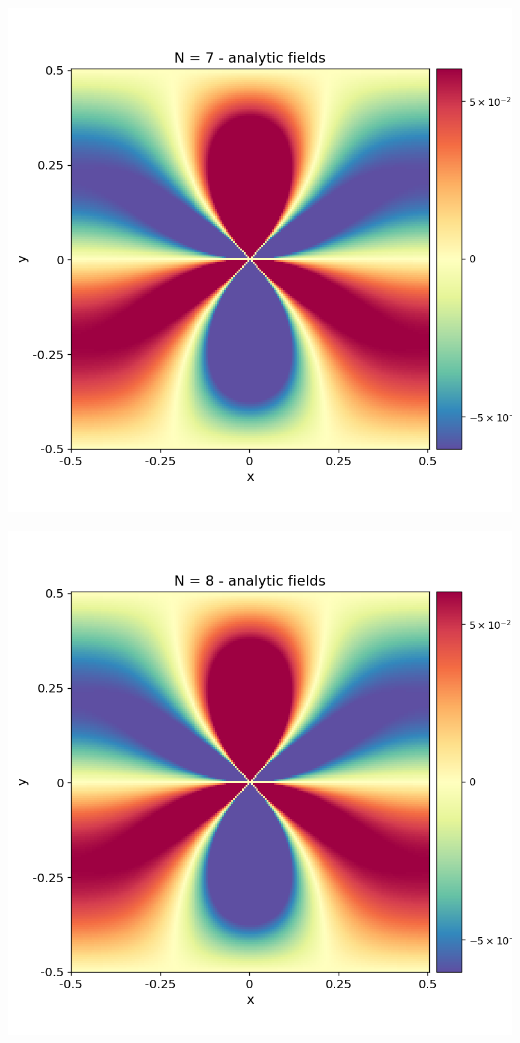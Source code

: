 \documentclass[12pt,a4paper]{article}
\theoremstyle{plain}
\begin{document}
\begin{multicols*}{2}
\begin{minipage}{0.22\columnwidth}
	\end{minipage}
	\begin{minipage}{0.22\columnwidth}
		\centering
		\includegraphics[width=\columnwidth]{./stress_field_07.png}
	\end{minipage}
	\begin{minipage}{0.22\columnwidth}
		\centering
		\includegraphics[width=\columnwidth]{./stress_field_08.png}
	\end{minipage}


\end{multicols*}
\end{document}
